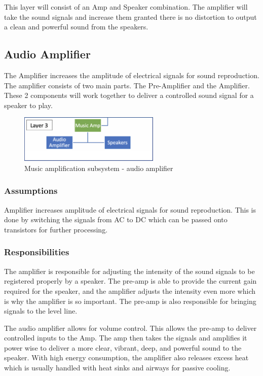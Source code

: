 This layer will consist of an Amp and Speaker combination. The amplifier will take the sound signals and increase them granted there is no distortion to output a clean and powerful sound from the speakers.

\subsection{Audio Amplifier}
The Amplifier increases the amplitude of electrical signals for sound reproduction. The amplifier consists of two main parts. The Pre-Amplifier and the Amplifier. These 2 components will work together to deliver a controlled sound signal for a speaker to play.

\begin{figure}[h!]
	\centering
 	\includegraphics[width=0.60\textwidth]{images/subsystem3}
 \caption{Music amplification subsystem - audio amplifier}
\end{figure}

\subsubsection{Assumptions}
Amplifier increases amplitude of electrical signals for sound reproduction. This is done by switching the signals from AC to DC which can be passed onto transistors for further processing.

\subsubsection{Responsibilities}
The amplifier is responsible for adjusting the intensity of the sound signals to be registered properly by a speaker. The pre-amp is able to provide the current gain required for the speaker, and the amplifier adjusts the intensity even more which is why the amplifier is so important. The pre-amp is also responsible for bringing signals to the level line.

The audio amplifier allows for volume control. This allows the pre-amp to deliver controlled inputs to the Amp. The amp then takes the signals and amplifies it power wise to deliver a more clear, vibrant, deep, and powerful sound to the speaker. With high energy consumption, the amplifier also releases excess heat which is usually handled with heat sinks and airways for passive cooling.

